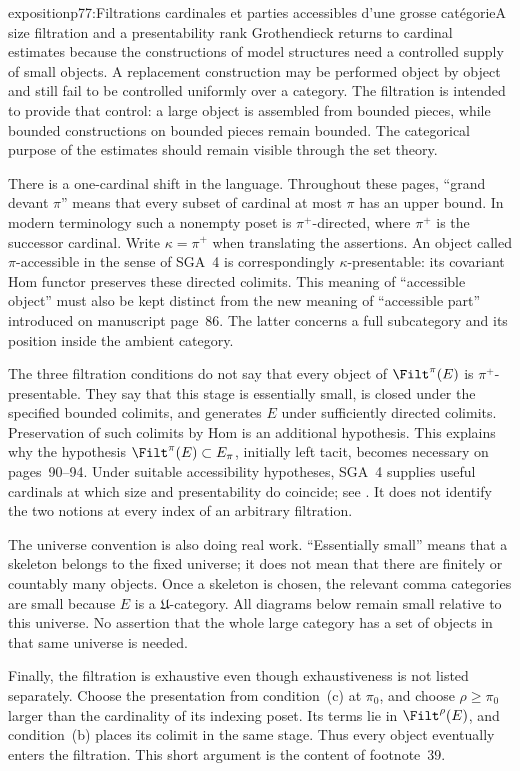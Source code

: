 \begin{dcomment}{exposition}{p77:Filtrations cardinales et parties accessibles d'une grosse catégorie}{A size filtration and a presentability rank}
Grothendieck returns to cardinal estimates because the constructions of model structures need a controlled supply of small objects. A replacement construction may be performed object by object and still fail to be controlled uniformly over a category. The filtration is intended to provide that control: a large object is assembled from bounded pieces, while bounded constructions on bounded pieces remain bounded. The categorical purpose of the estimates should remain visible through the set theory.

There is a one-cardinal shift in the language. Throughout these pages, ``grand devant $\pi$'' means that every subset of cardinal at most $\pi$ has an upper bound. In modern terminology such a nonempty poset is $\pi^+$-directed, where $\pi^+$ is the successor cardinal. Write $\kappa=\pi^+$ when translating the assertions. An object called $\pi$-accessible in the sense of SGA~4 is correspondingly $\kappa$-presentable: its covariant Hom functor preserves these directed colimits. This meaning of ``accessible object'' must also be kept distinct from the new meaning of ``accessible part'' introduced on manuscript page~86. The latter concerns a full subcategory and its position inside the ambient category.

The three filtration conditions do not say that every object of $\Filt^\pi(E)$ is $\pi^+$-presentable. They say that this stage is essentially small, is closed under the specified bounded colimits, and generates $E$ under sufficiently directed colimits. Preservation of such colimits by Hom is an additional hypothesis. This explains why the hypothesis $\Filt^\pi(E)\subset E_\pi$, initially left tacit, becomes necessary on pages~90--94. Under suitable accessibility hypotheses, SGA~4 supplies useful cardinals at which size and presentability do coincide; see \citet[I, 9.16--9.18]{SGA4I1972}. It does not identify the two notions at every index of an arbitrary filtration.

The universe convention is also doing real work. ``Essentially small'' means that a skeleton belongs to the fixed universe; it does not mean that there are finitely or countably many objects. Once a skeleton is chosen, the relevant comma categories are small because $E$ is a $\mathfrak U$-category. All diagrams below remain small relative to this universe. No assertion that the whole large category has a set of objects in that same universe is needed.

Finally, the filtration is exhaustive even though exhaustiveness is not listed separately. Choose the presentation from condition~(c) at $\pi_0$, and choose $\rho\geq\pi_0$ larger than the cardinality of its indexing poset. Its terms lie in $\Filt^\rho(E)$, and condition~(b) places its colimit in the same stage. Thus every object eventually enters the filtration. This short argument is the content of footnote~39.
\end{dcomment}

